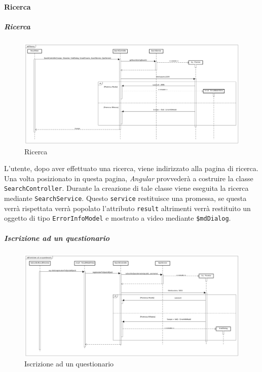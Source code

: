 \paragraph{Ricerca}

\subparagraph{Ricerca}

\label{Ricerca}

\begin{figure}[ht]
	\centering
	\includegraphics[scale=0.260,keepaspectratio]{UML/DiagrammiDiSequenza/Front-end/Search.png}
	\caption{Ricerca}
\end{figure} \FloatBarrier

L'utente, dopo aver effettuato una ricerca, viene indirizzato alla pagina di ricerca. Una volta posizionato in questa pagina, \textit{Angular} provvederà a costruire la classe \texttt{SearchController}. Durante la creazione di tale classe viene eseguita la ricerca mediante \texttt{SearchService}. Questo \texttt{service} restituisce una promessa, se questa verrà rispettata verrà popolato l'attributo \texttt{result} altrimenti verrà restituito un oggetto di tipo \texttt{ErrorInfoModel} e mostrato a video mediante \texttt{\$mdDialog}.

\subparagraph{Iscrizione ad un questionario}

\label{Iscrizione ad un questionario}

\begin{figure}[ht]
	\centering
	\includegraphics[scale=0.275,keepaspectratio]{UML/DiagrammiDiSequenza/Front-end/Search_subscribeToQuiz.png}
	\caption{Iscrizione ad un questionario}
\end{figure} \FloatBarrier

